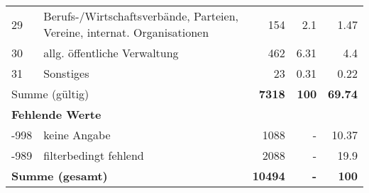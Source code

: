 \begin{longtable}{lXrrr}
        29 & \multicolumn{1}{X}{Berufs-/Wirtschaftsverbände, Parteien, Vereine, internat. Organisationen} & %
          \num{154} &
          \num[round-mode=places,round-precision=2]{2.1} &
          \num[round-mode=places,round-precision=2]{1.47} \\

        30 & \multicolumn{1}{X}{allg. öffentliche Verwaltung} & %
          \num{462} &
          \num[round-mode=places,round-precision=2]{6.31} &
          \num[round-mode=places,round-precision=2]{4.4} \\

        31 & \multicolumn{1}{X}{Sonstiges} & %
          \num{23} &
          \num[round-mode=places,round-precision=2]{0.31} &
          \num[round-mode=places,round-precision=2]{0.22} \\

     \midrule
     \multicolumn{2}{l}{Summe (gültig)} &
       \textbf{\num{7318}} &
     \textbf{\num{100}} &
       \textbf{\num[round-mode=places,round-precision=2]{69.74}} \\
     \multicolumn{5}{l}{\textbf{Fehlende Werte}}\\
       -998 &
       keine Angabe &
         \num{1088} &
        - &
         \num[round-mode=places,round-precision=2]{10.37} \\
       -989 &
       filterbedingt fehlend &
         \num{2088} &
        - &
         \num[round-mode=places,round-precision=2]{19.9} \\
     \midrule
     \multicolumn{2}{l}{\textbf{Summe (gesamt)}} &
          \textbf{\num{10494}} &
        \textbf{-} &
        \textbf{\num{100}} \\
     \bottomrule
     \end{longtable}
     

